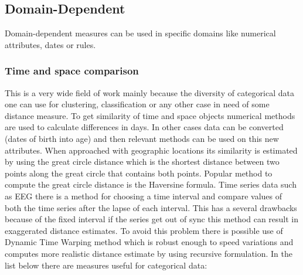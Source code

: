 \subsection{Domain-Dependent}
Domain-dependent measures can be used in specific domains like numerical attributes, dates or rules.
\subsubsection{Time and space comparison}
This is a very wide field of work mainly because the diversity of categorical data one can use for clustering, classification or any other case in need of some distance measure.
To get similarity of time and space objects numerical methods are used to calculate differences in days. In other cases data can be converted (dates of birth into age) and then relevant methods can be used on this new attributes.
When approached with geographic locations its similarity is estimated by using the great circle distance which is the shortest distance between two points along the great circle that contains both points. Popular method to compute the great circle distance is the Haversine formula.
Time series data such as EEG there is a method for choosing a time interval and compare values of both the time series after the lapse of each interval. This has a several drawbacks because of the fixed interval if the series get out of sync this method can result in exaggerated distance estimates. To avoid this problem there is possible use of Dynamic Time Warping method which is robust enough to speed variations and computes more realistic distance estimate by using recursive formulation.
In the list below there are measures useful for categorical data:

